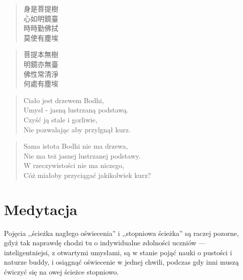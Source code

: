 \begin{minipage}[t]{0.4\textwidth}
\begin{verse}
身是菩提樹\\
心如明鏡臺\\
時時勤佛拭\\
莫使有塵埃
\end{verse}
\begin{verse}
菩提本無樹\\
明鏡亦無臺\\
佛性常清淨\\
何處有塵埃
\end{verse}
\end{minipage}
\begin{minipage}[t]{0.6\textwidth}
\itshape
\begin{verse}
Ciało jest drzewem Bodhi,\\
Umysł - jasną lustrzaną podstawą.\\
Czyść ją stale i gorliwie,\\
Nie pozwalając aby przylgnął kurz. 
\end{verse}
\begin{verse}
Sama istota Bodhi nie ma drzewa,\\
Nie ma też jasnej lustrzanej podstawy.\\
W rzeczywistości nie ma niczego,\\
Cóż miałoby przyciągać jakikolwiek kurz?
\end{verse}
\end{minipage}

\section{Medytacja}

Pojęcia ,,ścieżka nagłego oświecenia'' i ,,stopniowa ścieżka'' są raczej pozorne, gdyż tak naprawdę chodzi tu o indywidualne zdolności uczniów --- inteligentniejsi, z otwartymi umysłami, są w stanie pojąć nauki o pustości i naturze buddy, i osiągnąć oświecenie w jednej chwili, podczas gdy inni muszą ćwiczyć się na owej ścieżce stopniowo.


